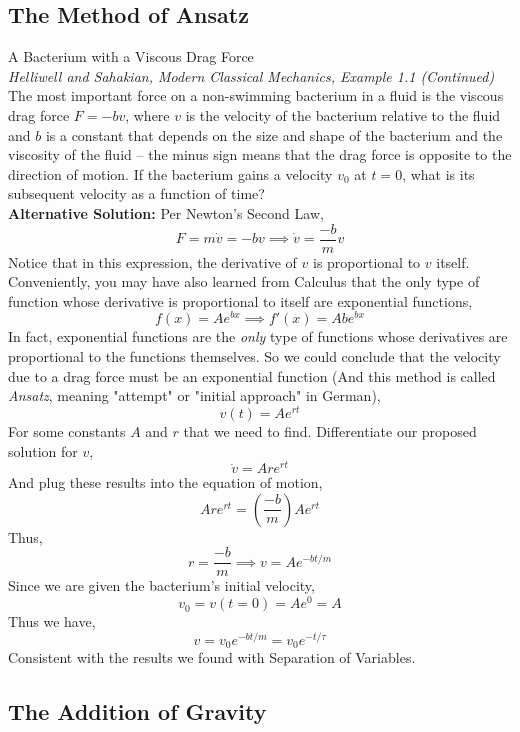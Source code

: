 \documentclass[11pt]{article}
\theoremstyle{gangnamstyle}{\newtheorem{definition}{Definition}[]}
\theoremstyle{gangnamstyle}{\newtheorem{example}{Example}[]}
\theoremstyle{gangnamstyle}{\newtheorem{problem}{Problem}[]}
\theoremstyle{gangnamstyle}{\newtheorem{warning}{Warning}[]}
\begin{document}
\subsection{The Method of Ansatz}

\begin{example}
A Bacterium with a Viscous Drag Force \\
\textit{Helliwell and Sahakian, Modern Classical Mechanics, Example 1.1 (Continued)} \\
The most important force on a non-swimming bacterium in a fluid is the viscous drag force $F = -bv$, where $v$ is the velocity of the bacterium relative to the fluid and $b$ is a constant that depends on the size and shape of the bacterium and the viscosity of the fluid – the minus sign means that the drag force is opposite to the direction of motion. If the bacterium gains a velocity $v_0$ at $t = 0$, what is its subsequent velocity as a function of time? \\

\textbf{Alternative Solution:} Per Newton's Second Law, 
\[ F = m\Dot{v} = -bv \implies \Dot{v} = \frac{-b}{m}v \]
Notice that in this expression, the derivative of $v$ is proportional to $v$ itself. Conveniently, you may have also learned from Calculus that the only type of function whose derivative is proportional to itself are exponential functions, 
\[ f(x) = Ae^{bx} \implies f'(x) = Abe^{bx} \]
In fact, exponential functions are the \textit{only} type of functions whose derivatives are proportional to the functions themselves. So we could conclude that the velocity due to a drag force must be an exponential function (And this method is called \textit{Ansatz}, meaning "attempt" or "initial approach" in German), 
\[ v(t) = Ae^{rt} \]
For some constants $A$ and $r$ that we need to find. Differentiate our proposed solution for $v$, 
\[ \Dot{v} = Are^{rt} \]
And plug these results into the equation of motion, 
\[ Are^{rt} = (\frac{-b}{m})Ae^{rt} \]
Thus, 
\[ r = \frac{-b}{m} \implies v = Ae^{-bt/m} \]
Since we are given the bacterium's initial velocity, 
\[ v_0 = v(t = 0) = Ae^0 = A \]
Thus we have, 
\[ v = v_0e^{-bt/m} = v_0e^{-t / \tau} \]
Consistent with the results we found with Separation of Variables. 
\end{example}

\subsection{The Addition of Gravity}
\end{document}

